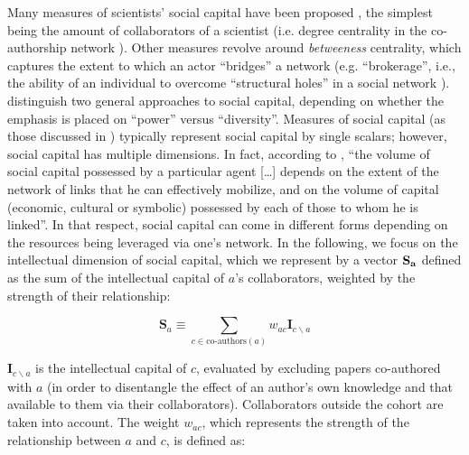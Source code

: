 \documentclass{article}
\begin{document}
Many measures of scientists' social capital have been proposed \citep{Abbasi2014,Schirone2023}, the simplest being the amount of collaborators of a scientist (i.e. degree centrality in the co-authorship network \citealt{Roth2010}). Other measures revolve around \textit{betweeness} centrality, which captures the extent to which an actor ``bridges'' a network (e.g. ``brokerage'', i.e., the ability of an individual to overcome ``structural holes'' in a social network \citep{BurtBrokerage2007}). \citet{Abbasi2014} distinguish two general approaches to social capital, depending on whether the emphasis is placed on ``power'' versus ``diversity''. Measures of social capital (as those discussed in \citealt{Abbasi2014}) typically represent social capital by single scalars; however, social capital has multiple dimensions. In fact, according to \citet{Bourdieu1980}, ``the volume of social capital possessed by a particular agent [\dots] depends on the extent of the network of links that he can effectively mobilize, and on the volume of capital (economic, cultural or symbolic) possessed by each of those to whom he is linked''. In that respect, social capital can come in different forms depending on the resources being leveraged via one's network. %
In the following, we focus on the intellectual dimension of social capital, which we represent by a vector $\bf{S}_{a}$  %
defined as the sum of the intellectual capital of $a$'s collaborators, weighted by the strength of their relationship:

\begin{equation}
    \bm{S}_{a} \equiv \sum_{c \in \text{co-authors}(a)} w_{ac} \bm{I}_{c\backslash a}
\end{equation}

$\bm{I}_{c\backslash a}$ is the intellectual capital of $c$, evaluated by excluding papers co-authored with $a$ (in order to disentangle the effect of an author's own knowledge and that available to them via their collaborators). Collaborators outside the cohort are taken into account. The weight $w_{ac}$, which represents the strength of the relationship between $a$ and $c$, is defined as:
\end{document}
